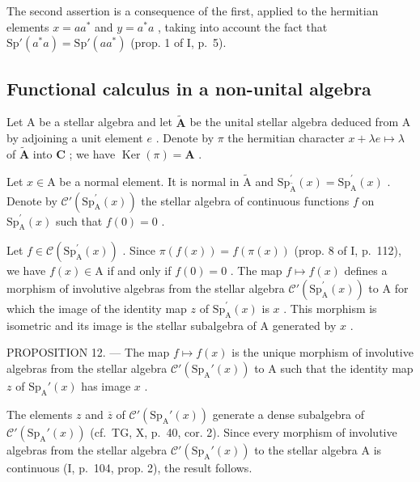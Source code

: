 The second assertion is a consequence of the first, applied to the hermitian elements \(x = aa^{*}\) and \(y = a^{*}a\) , taking into account the fact that \(\mathrm{Sp}'(a^{*}a) = \mathrm{Sp}'(aa^{*})\) (prop. 1 of I, p.~5).

\subsection{Functional calculus in a non-unital algebra}

Let A be a stellar algebra and let \(\widetilde{\mathbf{A}}\) be the unital stellar algebra deduced from A by adjoining a unit element \(e\) . Denote by \(\pi\) the hermitian character \(x + \lambda e \mapsto \lambda\) of \(\widetilde{\mathbf{A}}\) into \(\mathbf{C}\) ; we have \(\operatorname{Ker}(\pi) = \mathbf{A}\) .

Let \(x \in \mathrm{A}\) be a normal element. It is normal in \(\widetilde{\mathrm{A}}\) and \(\mathrm{Sp}_{\widetilde{\mathrm{A}}}^{\prime}(x) = \mathrm{Sp}_{\mathrm{A}}^{\prime}(x)\) . Denote by \(\mathcal{C}'(\mathrm{Sp}_{\mathrm{A}}^{\prime}(x))\) the stellar algebra of continuous functions \(f\) on \(\mathrm{Sp}_{\mathrm{A}}^{\prime}(x)\) such that \(f(0) = 0\) .

Let \(f \in \mathcal{C}(\mathrm{Sp}_{\mathrm{A}}^{\prime}(x))\) . Since \(\pi(f(x)) = f(\pi(x))\) (prop. 8 of I, p.~112), we have \(f(x) \in \mathrm{A}\) if and only if \(f(0) = 0\) . The map \(f \mapsto f(x)\) defines a morphism of involutive algebras from the stellar algebra \(\mathcal{C}'(\mathrm{Sp}_{\mathrm{A}}^{\prime}(x))\) to A for which the image of the identity map \(z\) of \(\mathrm{Sp}_{\mathrm{A}}^{\prime}(x)\) is \(x\) . This morphism is isometric and its image is the stellar subalgebra of A generated by \(x\) .

PROPOSITION 12. --- The map \(f \mapsto f(x)\) is the unique morphism of involutive algebras from the stellar algebra \(\mathcal{C}'(\mathrm{Sp}_{\mathrm{A}}'(x))\) to A such that the identity map \(z\) of \(\mathrm{Sp}_{\mathrm{A}}'(x)\) has image \(x\) .

The elements \(z\) and \(\overline{z}\) of \(\mathcal{C}'(\mathrm{Sp}_{\mathrm{A}}'(x))\) generate a dense subalgebra of \(\mathcal{C}'(\mathrm{Sp}_{\mathrm{A}}'(x))\) (cf.~TG, X, p.~40, cor. 2). Since every morphism of involutive algebras from the stellar algebra \(\mathcal{C}'(\mathrm{Sp}_{\mathrm{A}}'(x))\) to the stellar algebra A is continuous (I, p.~104, prop. 2), the result follows.

